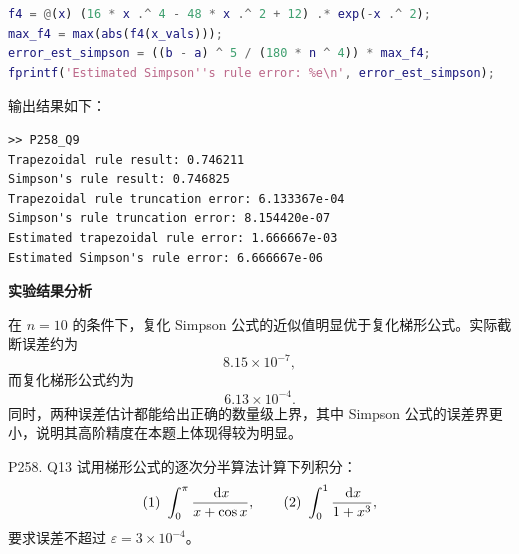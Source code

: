 \documentclass[11pt, a4paper]{ctexart}
\begin{document}
\begin{solution}
\begin{lstlisting}[language=Matlab]
f4 = @(x) (16 * x .^ 4 - 48 * x .^ 2 + 12) .* exp(-x .^ 2);
max_f4 = max(abs(f4(x_vals)));
error_est_simpson = ((b - a) ^ 5 / (180 * n ^ 4)) * max_f4;
fprintf('Estimated Simpson''s rule error: %e\n', error_est_simpson);
\end{lstlisting}

    输出结果如下：

\begin{lstlisting}
>> P258_Q9
Trapezoidal rule result: 0.746211
Simpson's rule result: 0.746825
Trapezoidal rule truncation error: 6.133367e-04
Simpson's rule truncation error: 8.154420e-07
Estimated trapezoidal rule error: 1.666667e-03
Estimated Simpson's rule error: 6.666667e-06
\end{lstlisting}

    \textbf{实验结果分析}

    在 $n=10$ 的条件下，复化 Simpson 公式的近似值明显优于复化梯形公式。实际截断误差约为
    \[
        8.15\times 10^{-7},
    \]
    而复化梯形公式约为
    \[
        6.13\times 10^{-4}.
    \]
    同时，两种误差估计都能给出正确的数量级上界，其中 Simpson 公式的误差界更小，说明其高阶精度在本题上体现得较为明显。
\end{solution}


\begin{problem}{P258. Q13}
    试用梯形公式的逐次分半算法计算下列积分：
    \[
        \text{(1)}\ \int_0^\pi \frac{\,\mathrm{d} x}{x+\cos x},
        \qquad
        \text{(2)}\ \int_0^1 \frac{\,\mathrm{d} x}{1+x^3},
    \]
    要求误差不超过 $\varepsilon=3\times 10^{-4}$。
\end{problem}
\end{document}
